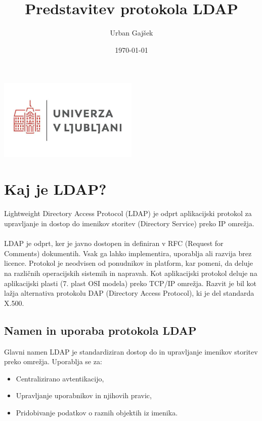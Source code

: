 \documentclass[a4paper,12pt]{article}
\begin{document}
\title{Predstavitev protokola LDAP}
\author{Urban Gaj\v{s}ek}
\date{\today}
\maketitle

\begin{center}
    \includegraphics[width=0.5\textwidth]{figures/univerza-v-ljubljani.png}
\end{center}

\newpage
\tableofcontents
\newpage

\section{Kaj je LDAP?}

Lightweight Directory Access Protocol (LDAP) je odprt aplikacijski protokol za upravljanje in dostop do imenikov storitev (Directory Service) preko IP omrežja. 

\paragraph{}
LDAP je odprt, ker je javno dostopen in definiran v RFC (Request for Comments) dokumentih. Vsak ga lahko implementira, uporablja ali razvija brez licence. Protokol je neodvisen od ponudnikov in platform, kar pomeni, da deluje na različnih operacijskih sistemih in napravah. Kot aplikacijski protokol deluje na aplikacijski plasti (7. plast OSI modela) preko TCP/IP omrežja. Razvit je bil kot lažja alternativa protokolu DAP (Directory Access Protocol), ki je del standarda X.500.

\subsection{Namen in uporaba protokola LDAP}
Glavni namen LDAP je standardiziran dostop do in upravljanje imenikov storitev preko omrežja. Uporablja se za:
\begin{itemize}
    \item Centralizirano avtentikacijo,
    \item Upravljanje uporabnikov in njihovih pravic,
    \item Pridobivanje podatkov o raznih objektih iz imenika.
\end{itemize}
\end{document}

